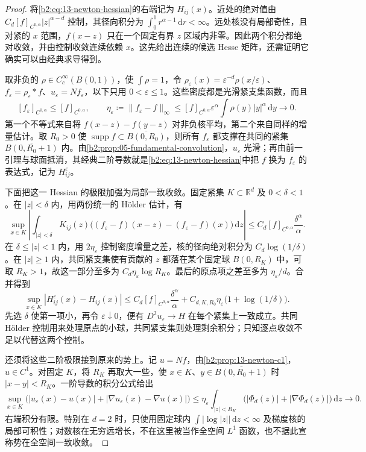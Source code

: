 \begin{proof}
将\eqref{b2:eq:13-newton-hessian}的右端记为 \(H_{ij}(x)\)。近处的绝对值由 \(C_d[f]_{C^{0,\alpha}}|z|^{\alpha-d}\) 控制，其径向积分为 \(\int_0^1r^{\alpha-1}\,\mathrm{d}r<\infty\)。远处核没有局部奇性，且对紧的 \(x\) 范围，\(f(x-z)\) 只在一个固定有界 \(z\) 区域内非零。因此两个积分都绝对收敛，并由控制收敛连续依赖 \(x\)。这先给出连续的候选 Hesse 矩阵，还需证明它确实可以由经典求导得到。

取非负的 \(\rho\in C_c^\infty(B(0,1))\)，使 \(\int\rho=1\)，令 \(\rho_\varepsilon(x)=\varepsilon^{-d}\rho(x/\varepsilon)\)、\(f_\varepsilon=\rho_\varepsilon*f\)、\(u_\varepsilon=Nf_\varepsilon\)，以下只用 \(0<\varepsilon\leq1\)。这些密度都是光滑紧支集函数，而且
\[
 [f_\varepsilon]_{C^{0,\alpha}}\leq[f]_{C^{0,\alpha}},\qquad
 \eta_\varepsilon\coloneqq\|f_\varepsilon-f\|_\infty
 \leq [f]_{C^{0,\alpha}}\varepsilon^\alpha
             \int\rho(y)|y|^\alpha\,\mathrm{d}y\longrightarrow0.
\]
第一个不等式来自将 \(f(x-z)-f(y-z)\) 对非负核平均，第二个来自同样的增量估计。取 \(R_0>0\) 使 \(\operatorname{supp}f\subset\overline{B(0,R_0)}\)，则所有 \(f_\varepsilon\) 都支撑在共同的紧集 \(\overline{B(0,R_0+1)}\) 内。由\cref{b2:prop:05-fundamental-convolution}，\(u_\varepsilon\) 光滑；再由前一引理与球面抵消，其经典二阶导数就是\eqref{b2:eq:13-newton-hessian}中把 \(f\) 换为 \(f_\varepsilon\) 的表达式，记为 \(H_{ij}^\varepsilon\)。

下面把这一 Hessian 的极限加强为局部一致收敛。固定紧集 \(K\subset\mathbb R^d\) 及 \(0<\delta<1\)。在 \(|z|<\delta\) 内，用两份统一的 Hölder 估计，有
\[
 \sup_{x\in K}\left|\int_{|z|<\delta}K_{ij}(z)
 \bigl((f_\varepsilon-f)(x-z)-(f_\varepsilon-f)(x)\bigr)\,\mathrm{d}z\right|
 \leq C_d[f]_{C^{0,\alpha}}\frac{\delta^\alpha}{\alpha}.
\]
在 \(\delta\leq|z|<1\) 内，用 \(2\eta_\varepsilon\) 控制密度增量之差，核的径向绝对积分为 \(C_d\log(1/\delta)\)。在 \(|z|\geq1\) 内，共同紧支集使有贡献的 \(z\) 都落在某个固定球 \(B(0,R_K)\) 中，可取 \(R_K>1\)，故这一部分至多为 \(C_d\eta_\varepsilon\log R_K\)。最后的原点项之差至多为 \(\eta_\varepsilon/d\)。合并得到
\[
 \sup_{x\in K}|H_{ij}^\varepsilon(x)-H_{ij}(x)|
 \leq C_d[f]_{C^{0,\alpha}}\frac{\delta^\alpha}{\alpha}
       +C_{d,K,R_0}\eta_\varepsilon\bigl(1+\log(1/\delta)\bigr).
\]
先选 \(\delta\) 使第一项小，再令 \(\varepsilon\downarrow0\)，便有 \(D^2u_\varepsilon\to H\) 在每个紧集上一致成立。共同 Hölder 控制用来处理原点的小球，共同紧支集则处理剩余积分；只知逐点收敛不足以代替这两个控制。

还须将这些二阶极限接到原来的势上。记 \(u=Nf\)，由\cref{b2:prop:13-newton-c1}，\(u\in C^1\)。对固定 \(K\)，将 \(R_K\) 再取大一些，使 \(x\in K\)、\(y\in\overline{B(0,R_0+1)}\) 时 \(|x-y|<R_K\)。一阶导数的积分公式给出
\[
 \sup_{x\in K}\bigl(|u_\varepsilon(x)-u(x)|
             +|\nabla u_\varepsilon(x)-\nabla u(x)|\bigr)
 \leq \eta_\varepsilon\int_{|z|<R_K}
                    \bigl(|\Phi_d(z)|+|\nabla\Phi_d(z)|\bigr)\,\mathrm{d}z
 \longrightarrow0.
\]
右端积分有限。特别在 \(d=2\) 时，只使用固定球内 \(\int|\log|z||\,\mathrm{d}z<\infty\) 及梯度核的局部可积性；对数核在无穷远增长，不在这里被当作全空间 \(L^1\) 函数，也不据此宣称势在全空间一致收敛。


\end{proof}
